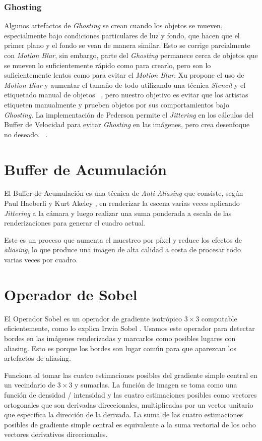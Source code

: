 \documentclass[pregrado]{tesis-usb} %
\begin{document}
\subsubsection{Ghosting} 
Algunos artefactos de \textit{Ghosting} se crean cuando los objetos se mueven, especialmente bajo condiciones particulares de luz y fondo, que hacen que el primer plano y el fondo se vean de manera similar. Esto se corrige parcialmente con \textit{Motion Blur}, sin embargo, parte del \textit{Ghosting} permanece cerca de objetos que se mueven lo suficientemente rápido como para crearlo, pero son lo suficientemente lentos como para evitar el \textit{Motion Blur}. Xu propone el uso de \textit{Motion Blur} y aumentar el tamaño de todo utilizando una técnica \textit{Stencil} y el etiquetado manual de objetos ~\cite{XU2016}, pero nuestro objetivo es evitar que los artistas etiqueten manualmente y prueben objetos por sus comportamientos bajo \textit{Ghosting}. La implementación de Pederson permite el \textit{Jittering} en los cálculos del Buffer de Velocidad para evitar \textit{Ghosting} en las imágenes, pero crea desenfoque no deseado. ~\cite{Fuglsand2016}. 

\section{Buffer de Acumulación}
El Buffer de Acumulación es una técnica de \textit{Anti-Aliasing} que consiste, según Paul Haeberli y Kurt Akeley \cite{Haeberli1990}, en renderizar la escena varias veces aplicando \textit{Jittering} a la cámara y luego realizar una suma ponderada a escala de las renderizaciones para generar el cuadro actual.

Este es un proceso que aumenta el muestreo por píxel y reduce los efectos de \textit{aliasing}, lo que produce una imagen de alta calidad a costa de procesar todo varias veces por cuadro.

\section{Operador de Sobel}
El Operador Sobel es un operador de gradiente isotrópico $3\times 3$ computable eficientemente, como lo explica Irwin Sobel \cite{Sobel2014}. Usamos este operador para detectar bordes en las imágenes renderizadas y marcarlos como posibles lugares con aliasing. Esto es porque los bordes son lugar común para que aparezcan los artefactos de aliasing. 

Funciona al tomar las cuatro estimaciones posibles del gradiente simple central en un vecindario de $3\times 3$ y sumarlas. La función de imagen se toma como una función de densidad / intensidad y las cuatro estimaciones posibles como vectores ortogonales que son derivadas direccionales, multiplicadas por un vector unitario que especifica la dirección de la derivada. La suma de las cuatro estimaciones posibles de gradiente simple central es equivalente a la suma vectorial de los ocho vectores derivativos direccionales.
\end{document}
